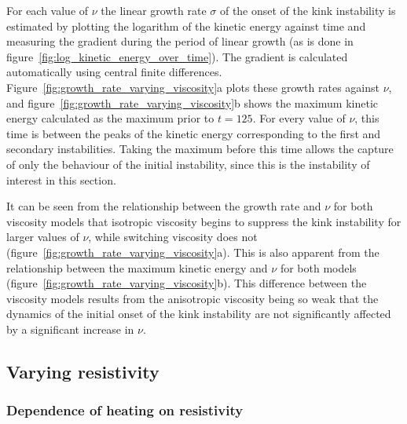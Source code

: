 For each value of $\nu$ the linear growth rate $\sigma$ of the onset of the kink instability is estimated by plotting the logarithm of the kinetic energy against time and measuring the gradient during the period of linear growth (as is done in figure~\ref{fig:log_kinetic_energy_over_time}). The gradient is calculated automatically using central finite differences. Figure~\ref{fig:growth_rate_varying_viscosity}a plots these growth rates against $\nu$, and figure~\ref{fig:growth_rate_varying_viscosity}b shows the maximum kinetic energy calculated as the maximum prior to $t=125$. For every value of $\nu$, this time is between the peaks of the kinetic energy corresponding to the first and secondary instabilities. Taking the maximum before this time allows the capture of only the behaviour of the initial instability, since this is the instability of interest in this section.

It can be seen from the relationship between the growth rate and $\nu$ for both viscosity models that isotropic viscosity begins to suppress the kink instability for larger values of $\nu$, while switching viscosity does not (figure~\ref{fig:growth_rate_varying_viscosity}a). This is also apparent from the relationship between the maximum kinetic energy and $\nu$ for both models (figure~\ref{fig:growth_rate_varying_viscosity}b). This difference between the viscosity models results from the anisotropic viscosity being so weak that the dynamics of the initial onset of the kink instability are not significantly affected by a significant increase in $\nu$.

\subsection{Varying resistivity}

\subsubsection{Dependence of heating on resistivity}

